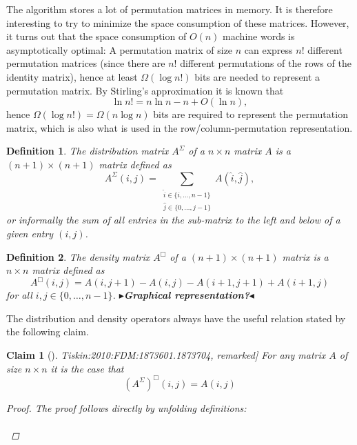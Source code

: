 \documentclass[twoside,11pt,openright]{report}
\newcommand{\todo}[1]{{\color[rgb]{.5,0,0}\textbf{$\blacktriangleright$#1$\blacktriangleleft$}}}
\newcommand{\reftiskin}[2]{\cite[#1]{Tiskin:2010:FDM:1873601.1873704}, #2}
\newtheorem{mydef}{Definition}
\newtheorem{claim}{Claim}
\begin{document}
The algorithm stores a lot of permutation matrices in memory. It is therefore interesting to try to minimize the space consumption of these matrices. However, it turns out that the space consumption of $O(n)$ machine words is asymptotically optimal: A permutation matrix of size $n$ can express $n!$ different permutation matrices (since there are $n!$ different permutations of the rows of the identity matrix), hence at least $\Omega(\log{n!})$ bits are needed to represent a permutation matrix. By Stirling's approximation it is known that
\[
  \ln{n!} = n \ln{n} - n + O(\ln{n}),
\]
hence $\Omega(\log{n!}) = \Omega(n \log{n})$ bits are required to represent the permutation matrix, which is also what is used in the row/column-permutation representation.
%
\begin{mydef}
  The distribution matrix $A^{\Sigma}$ of a $n \times n$ matrix $A$ is a $(n + 1) \times (n + 1)$ matrix defined as
  \[
    A^{\Sigma}(i, j) = \sum_{\substack{\hat{i} \in \{i, \dots, n - 1\} \\ \hat{j} \in \{0, \dots, j - 1\}}} {A(\hat{i}, \hat{j})},
  \]
  or informally the sum of all entries in the sub-matrix to the left and below of a given entry $(i, j)$.
\end{mydef}
%
\begin{mydef}
  The density matrix $A^{\Box}$ of a $(n + 1) \times (n + 1)$ matrix is a $n \times n$ matrix defined as
  \[
    A^{\Box}(i, j) = A(i, j + 1) - A(i, j) - A(i + 1, j + 1) + A(i + 1, j)
  \]
  for all $i, j \in \{ 0, \dots, n - 1 \}$. \todo{Graphical representation?}
\end{mydef}%
The distribution and density operators always have the useful relation stated by the following claim.
\begin{claim}[\reftiskin{p. 1288}{remarked}]
  \label{claim:sigma-box-identity}
  For any matrix $A$ of size $n \times n$ it is the case that
  \[
    (A^{\Sigma})^{\Box}(i, j) = A(i, j)
  \]
  \begin{proof}
    The proof follows directly by unfolding definitions:\\
    \\
  \end{proof}
\end{claim}
\end{document}
